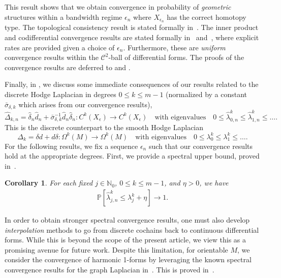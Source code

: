 \documentclass[11pt,reqno]{amsproc}
\numberwithin{equation}{section}
\newcommand{\N}{\mathbb{N}}
\newcommand{\PP}{\mathbb{P}}
\newcommand{\cC}{\mathcal{C}}
\newcommand{\hd}{\hat{d}}
\newcommand{\hdelta}{\hat{\delta}}
\newtheorem{corollary}[counter]{Corollary}
\theoremstyle{definition}
\theoremstyle{plain}
\begin{document}
This result shows that we obtain convergence in probability of \emph{geometric} structures within a bandwidth regime $\epsilon_n$ where $X_{\epsilon_n}$ has the correct homotopy type. The topological consistency result is stated formally in~. The inner product and codifferential convergence results are stated formally in~ and~, where explicit rates are provided given a choice of $\epsilon_n$. Furthermore, these are \emph{uniform} convergence results within the $\cC^2$-ball of differential forms. The proofs of the convergence results are deferred to  and .

Finally, in , we discuss some immediate consequences of our results related to the discrete Hodge Laplacian in degrees $0\leq k\leq m-1$ (normalized by a constant $\bar{\sigma}_{\delta,k}$ which arises from our convergence results),
\begin{equation}
    \hat\Delta_{k,n}=\hdelta_n\hd_n+\bar{\sigma}_{\delta,k}^{-1}\hd_n\hdelta_n : C^k(X_\epsilon) \to C^k(X_\epsilon) \quad \text{with eigenvalues} \quad 0 \leq \hat{\lambda}^{k}_{0,n} \leq \hat{\lambda}^k_{1,n} \leq \ldots .
\end{equation}
This is the discrete counterpart to the smooth Hodge Laplacian
\begin{equation}
    \Delta_k = \delta d + d \delta : \Omega^k(M) \to \Omega^k(M) \quad \text{with eigenvalues} \quad 0 \leq \lambda^k_0 \leq \lambda^k_1 \leq \ldots.
\end{equation}
For the following results, we fix a sequence $\epsilon_n$ such that our convergence results hold at the appropriate degrees. First, we provide a spectral upper bound, proved in~.
\begin{corollary}
    For each fixed $j\in\N_0$, $0\leq k\leq m-1$, and $\eta>0$, we have
    \begin{align}
        \PP\left[\hat{\lambda}^k_{j,n}\leq\lambda^k_j+\eta\right]\to1.
    \end{align}
\end{corollary}

In order to obtain stronger spectral convergence results, one must also develop \emph{interpolation} methods to go from discrete cochains back to continuous differential forms. While this is beyond the scope of the present article, we view this as a promising avenue for future work. Despite this limitation, for orientable $M$, we consider the convergence of harmonic 1-forms by leveraging the known spectral convergence results for the graph Laplacian in~\cite{calder_improved_2022}. This is proved in~.
\end{document}
